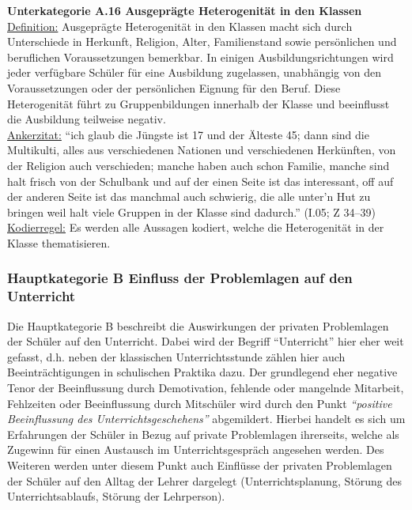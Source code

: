 \noindent
\textbf{Unterkategorie A.16 Ausgeprägte Heterogenität in den Klassen}\\
\underline{Definition:} Ausgeprägte Heterogenität in den Klassen macht sich durch Unterschiede in Herkunft, Religion, Alter, Familienstand sowie persönlichen und beruflichen Voraussetzungen bemerkbar. In einigen Ausbildungsrichtungen wird jeder verfügbare Schüler für eine Ausbildung zugelassen, unabhängig von den Voraussetzungen oder der persönlichen Eignung für den Beruf. Diese Heterogenität führt zu Gruppenbildungen innerhalb der Klasse und beeinflusst die Ausbildung teilweise negativ.\\
\underline{Ankerzitat:} "`ich glaub die Jüngste ist 17 und der Älteste 45; dann sind die Multikulti, alles aus verschiedenen Nationen und verschiedenen Herkünften, von der Religion auch verschieden; manche haben auch schon Familie, manche sind halt frisch von der Schulbank und auf der einen Seite ist das interessant, off auf der anderen Seite ist das manchmal auch schwierig, die alle unter'n Hut zu bringen weil halt viele Gruppen in der Klasse sind dadurch."' (I.05; Z 34--39)\\
\underline{Kodierregel:} Es werden alle Aussagen kodiert, welche die Heterogenität in der Klasse thematisieren.

\subsubsection{Hauptkategorie B Einfluss der Problemlagen auf den Unterricht}
\label{sec:HauptkategorieBEinflussDerProblemlagenAufDenUnterricht}

Die Hauptkategorie B beschreibt die Auswirkungen der privaten Problemlagen der Schüler auf den Unterricht. Dabei wird der Begriff "`Unterricht"' hier eher weit gefasst, d.h. neben der klassischen Unterrichtsstunde zählen hier auch Beeinträchtigungen in schulischen Praktika dazu. Der grundlegend eher negative Tenor der Beeinflussung durch Demotivation, fehlende oder mangelnde Mitarbeit, Fehlzeiten oder Beeinflussung durch Mitschüler wird durch den Punkt \textit{"`positive Beeinflussung des Unterrichtsgeschehens"'} abgemildert. Hierbei handelt es sich um Erfahrungen der Schüler in Bezug auf private Problemlagen ihrerseits, welche als Zugewinn für einen Austausch im Unterrichtsgespräch angesehen werden. Des Weiteren werden unter diesem Punkt auch Einflüsse der privaten Problemlagen der Schüler auf den Alltag der Lehrer dargelegt (Unterrichtsplanung, Störung des Unterrichtsablaufs, Störung der Lehrperson).\\

